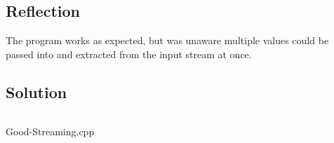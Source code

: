     \subsection*{Reflection}
        The program works as expected, but was unaware multiple values could be passed
        into and extracted from the input stream at once.
        
    \subsection*{Solution}
        \begin{listing}[H]
            \inputminted{cpp}{../Tasks/01-Good-Streaming/Good-Streaming.cpp}%
            \caption{Good-Streaming.cpp}
        \end{listing}